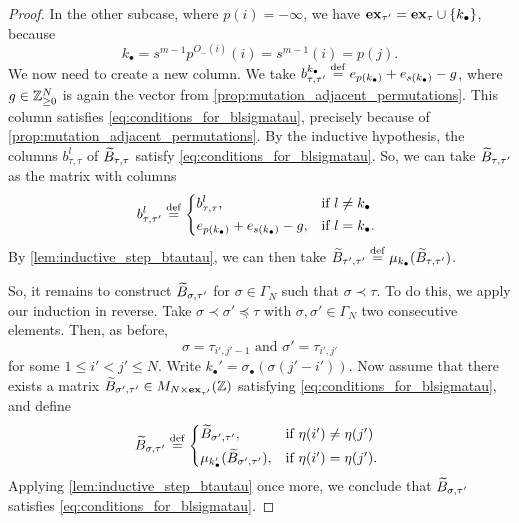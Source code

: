\begin{proof}
	In the other subcase, where $p(i) = -\infty$, we have $\mathbf{ex}_{\tau'} = \mathbf{ex}_\tau \cup
		\{k_\bullet\}$, because
	\begin{equation*}
		k_\bullet = s^{m-1}p^{O_{-}(i)}(i) = s^{m-1}(i) = p(j).
	\end{equation*}
	We now need to create a new column. We take $b^{k_\bullet}_{\tau, \tau'} \overset{\mathrm{def}}{=}
		e_{p(k_\bullet)} + e_{s(k_\bullet)} - g$, where $g \in \mathbb{Z}_{\geq 0}^N$ is again the
	vector from \cref{prop:mutation_adjacent_permutations}. This column satisfies
	\cref{eq:conditions_for_blsigmatau}, precisely because of
	\cref{prop:mutation_adjacent_permutations}. By the inductive hypothesis, the columns
	$b^l_{\tau, \tau}$ of $\widetilde{B}_{\tau, \tau}$ satisfy \cref{eq:conditions_for_blsigmatau}.
	So, we can take $\widetilde{B}_{\tau, \tau'}$ as the matrix with columns
	\begin{equation*}
		b^l_{\tau, \tau'} \defeq \begin{dcases*}
			b^l_{\tau, \tau},                        & if $l \neq k_\bullet$ \\
			e_{p(k_\bullet)} + e_{s(k_\bullet)} - g, & if $l = k_\bullet$.
		\end{dcases*}
	\end{equation*}
	By \cref{lem:inductive_step_btautau}, we can then take $\widetilde{B}_{\tau', \tau'} \overset{\mathrm{def}}{=}
		\mu_{k_\bullet}(\widetilde{B}_{\tau, \tau'})$.

	So, it remains to construct $\widetilde{B}_{\sigma, \tau'}$ for $\sigma \in \Gamma_N$ such that
	$\sigma \prec \tau$. To do this, we apply our induction in reverse. Take $\sigma \prec
		\sigma' \preceq \tau$ with $\sigma, \sigma' \in \Gamma_N$ two consecutive elements.
	Then, as before,
	\begin{equation*}
		\sigma = \tau_{i',j' -1} \text{ and } \sigma' = \tau_{i', j'}
	\end{equation*}
	for some $1 \leq i'< j' \leq N$. Write $k_\bullet' = \sigma_\bullet(\sigma(j' - i'))$. Now assume that there exists a matrix $\widetilde{B}_{\sigma', \tau'} \in M_{N \times \mathbf{ex}_{\tau'}}(\mathbb{Z})$ satisfying \cref{eq:conditions_for_blsigmatau}, and define
	\begin{equation*}
		\tB_{\sigma, \tau'} \defeq \begin{dcases*}
			\tB_{\sigma', \tau'},                   & if $\eta(i') \neq \eta(j')$ \\
			\mu_{k_\bullet'}(\tB_{\sigma', \tau'}), & if $\eta(i') = \eta(j')$.
		\end{dcases*}
	\end{equation*}
	Applying \cref{lem:inductive_step_btautau} once more, we conclude that $\widetilde{B}_{\sigma,
			\tau'}$ satisfies \cref{eq:conditions_for_blsigmatau}.

\end{proof}

